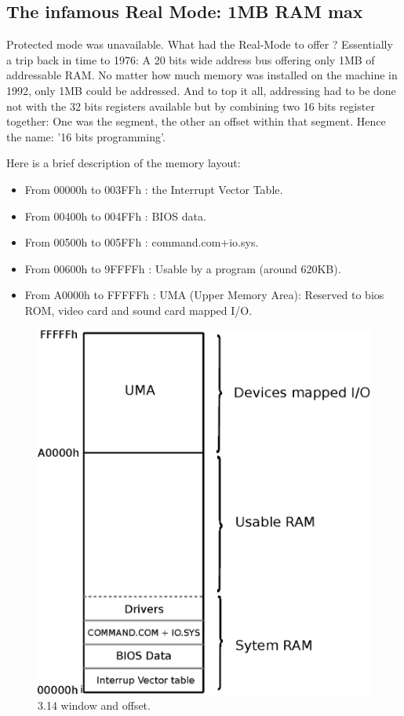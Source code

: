 \documentclass[book.tex]{subfiles}
\begin{document}
  \subsection{The infamous Real Mode: 1MB RAM max}
  Protected mode was unavailable. What had the Real-Mode to offer ? Essentially a trip back in time to 1976: A 20 bits wide address bus offering only 1MB of addressable RAM. No matter how much memory was installed on the machine in 1992, only 1MB could be addressed. And to top it all, addressing had to be done not with the 32 bits registers available but by combining two 16 bits register together: One was the segment, the other an offset within that segment. Hence the name: '16 bits programming'.

  \bigskip
Here is a brief description of the memory layout: \\
\begin{itemize}
\item From 00000h to 003FFh : the Interrupt Vector Table.
\item From 00400h to 004FFh : BIOS data.
\item From 00500h to 005FFh : command.com+io.sys.
\item From 00600h to 9FFFFh : Usable by a program (around 620KB). 
\item From A0000h to FFFFFh : UMA (Upper Memory Area): Reserved to bios ROM, video card and sound card mapped I/O.
\end{itemize}

\begin{figure}[H]
\centering
\includegraphics[scale=1]{imgs/real_mode}

\caption{3.14 window and offset.}
\label{fig:fp_internals}
\end{figure}
\end{document}
